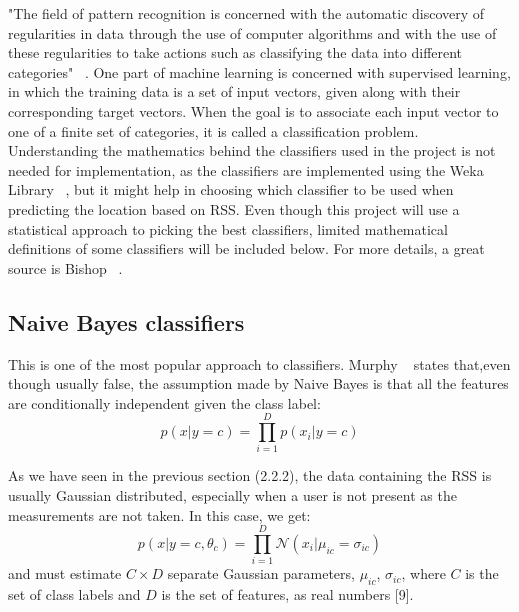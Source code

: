 "The field of pattern recognition is concerned with the automatic discovery of regularities in data through the use of computer algorithms and with the use of these regularities to take actions such as classifying the data into different categories" ~\cite{Bishop}.
One part of machine learning is concerned with supervised learning, in which the training data is a set of input vectors, given along with their corresponding target vectors. When the goal is to associate each input vector to one of a finite set of categories, it is called a classification problem. Understanding the mathematics behind the classifiers used in the project is not needed for implementation, as the classifiers are implemented using the Weka Library ~\cite{Weka}, but it might help in choosing which classifier to be used when predicting the location based on RSS. Even though this project will use a statistical approach to picking the best classifiers, limited mathematical definitions of some classifiers will be included below. For more details, a great source is Bishop ~\cite{Bishop}.

\subsection{Naive Bayes classifiers}
This is one of the most popular approach to classifiers. Murphy ~\cite{Murphy} states that,even though usually false, the assumption made by Naive Bayes is that all the features are conditionally independent given the class label:
$$ p(x|y = c) = \prod\limits_{i=1}^D p(x_i|y = c) $$

As we have seen in the previous section (2.2.2), the data containing the RSS is usually Gaussian distributed, especially when a user is not present as the measurements are not taken. In this case, we get:
$$ p(x|y = c,\theta_c) = \prod\limits_{i=1}^D \mathcal{N}(x_i|\mu_{ic} = \sigma_{ic}) $$ and must estimate $C \times D$ separate Gaussian parameters, $\mu_{ic}$, $\sigma_{ic}$, where $C$ is the set of class labels and $D$ is the set of features, as real numbers [9].

